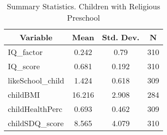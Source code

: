 
\begin{table}[htbp]\centering \caption{Summary Statistics. Children with Religious Preschool \label{schoolChildmaternaReli}}
\begin{tabular}{l c c  c}\hline\hline
\multicolumn{1}{c}{\textbf{Variable}} & \textbf{Mean}
 & \textbf{Std. Dev.} & \textbf{N}\\ \hline
IQ\_factor & 0.242 & 0.79  & 310\\
IQ\_score & 0.681 & 0.192  & 310\\
likeSchool\_child & 1.424 & 0.618  & 309\\
childBMI & 16.216 & 2.908  & 284\\
childHealthPerc & 0.693 & 0.462  & 309\\
childSDQ\_score & 8.565 & 4.079  & 310\\
\hline\end{tabular}
\end{table}
